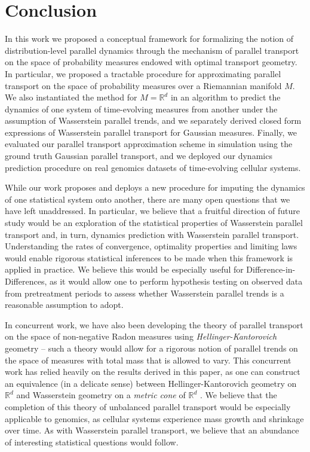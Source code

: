 \documentclass[11pt]{article}
\newcommand{\man}{M}
\begin{document}
\section{Conclusion}

In this work we proposed a conceptual framework for formalizing the notion of distribution-level parallel dynamics through the mechanism of parallel transport on the space of probability measures endowed with optimal transport geometry. In particular, we proposed a tractable procedure for approximating parallel transport on the space of probability measures over a Riemannian manifold $\man$. We also instantiated the method for $\man = \mathbb{R}^d$ in an algorithm to predict the dynamics of one system of time-evolving measures from another under the assumption of Wasserstein parallel trends, and we separately derived closed form expressions of Wasserstein parallel transport for Gaussian measures. Finally, we evaluated our parallel transport approximation scheme in simulation using the ground truth Gaussian parallel transport, and we deployed our dynamics prediction procedure on real genomics datasets of time-evolving cellular systems. 

While our work proposes and deploys a new procedure for imputing the dynamics of one statistical system onto another, there are many open questions that we have left unaddressed. In particular, we believe that a fruitful direction of future study would be an exploration of the statistical properties of Wasserstein parallel transport and, in turn, dynamics prediction with Wasserstein parallel transport. Understanding the rates of convergence, optimality properties and limiting laws would enable rigorous statistical inferences to be made when this framework is applied in practice. We believe this would be especially useful for Difference-in-Differences, as it would allow one to perform hypothesis testing on observed data from pretreatment periods to assess whether Wasserstein parallel trends is a reasonable assumption to adopt. 

In concurrent work, we have also been developing the theory of parallel transport on the space of non-negative Radon measures using \textit{Hellinger-Kantorovich} geometry -- such a theory would allow for a rigorous notion of parallel trends on the space of measures with total mass that is allowed to vary. This concurrent work has relied heavily on the results derived in this paper, as one can construct an equivalence (in a delicate sense) between Hellinger-Kantorovich geometry on $\mathbb{R}^d$ and Wasserstein geometry on a \textit{metric cone} of $\mathbb{R}^d$ \citep{liero2016optimal, liero2018optimal}. We believe that the completion of this theory of unbalanced parallel transport would be especially applicable to genomics, as cellular systems experience mass growth and shrinkage over time. As with Wasserstein parallel transport, we believe that an abundance of interesting statistical questions would follow. 
\end{document}
